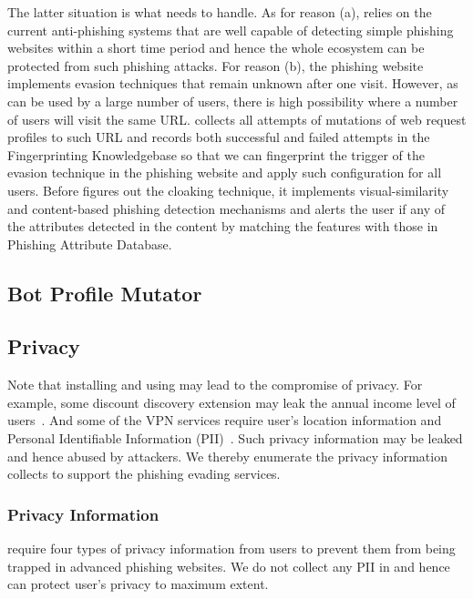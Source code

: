 The latter situation is what \spartacus needs to handle.
As for reason (a), \spartacus relies on the current anti-phishing systems that are well capable of detecting simple phishing websites within a short time period and hence the whole ecosystem can be protected from such phishing attacks.
For reason (b), the phishing website implements evasion techniques that remain unknown after one visit.
However, as \spartacus can be used by a large number of users, there is high possibility where a number of users will visit the same URL.
\spartacus collects all attempts of mutations of web request profiles to such URL and records both successful and failed attempts in the Fingerprinting Knowledgebase so that we can fingerprint the trigger of the evasion technique in the phishing website and apply such configuration for all \spartacus users.
Before \spartacus figures out the cloaking technique, it implements visual-similarity and content-based phishing detection mechanisms and alerts the user if any of the attributes detected in the content by matching the features with those in Phishing Attribute Database.


\subsection{Bot Profile Mutator}


\subsection{Privacy}

Note that installing and using \spartacus may lead to the compromise of privacy.
For example, some discount discovery extension may leak the annual income level of users~\cite{honey}.
And some of the VPN services require user's location information and Personal Identifiable Information (PII)~\cite{ZenMate}.
Such privacy information may be leaked and hence abused by attackers.  
We thereby enumerate the privacy information \spartacus collects to support the phishing evading services.

\subsubsection{Privacy Information}

\spartacus require four types of privacy information from users to prevent them from being trapped in advanced phishing websites.
We do not collect any PII in \spartacus and hence can protect user's privacy to maximum extent.

